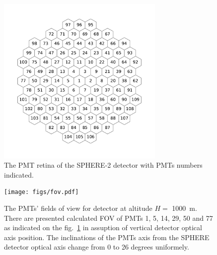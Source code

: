 \documentclass[final,5p,times,twocolumn]{elsarticle}
\begin{document}


\begin{figure}[tb]
\centering
\includegraphics[width=19pc]{figs/retina.pdf}%
\vspace{-1.0pc}
\caption{The PMT retina of the SPHERE-2 detector with PMTs numbers indicated.}
\label{fig:retina}
\end{figure}


\begin{figure}[bth]
\centering
\texttt{[image: figs/fov.pdf]}

\caption{The PMTs' fields of view for detector at altitude $H=$ 1000~m. There are presented calculated FOV of PMTs 1, 5, 14, 29, 50 and 77 as indicated on the fig.~\ref{fig:retina} in assuption of vertical detector optical axis position. The inclinations of the PMTs axis from the SPHERE detector optical axis change from 0 to 26 degrees uniformely.}
\label{fig:pmt_fov}
\end{figure}
\end{document}
